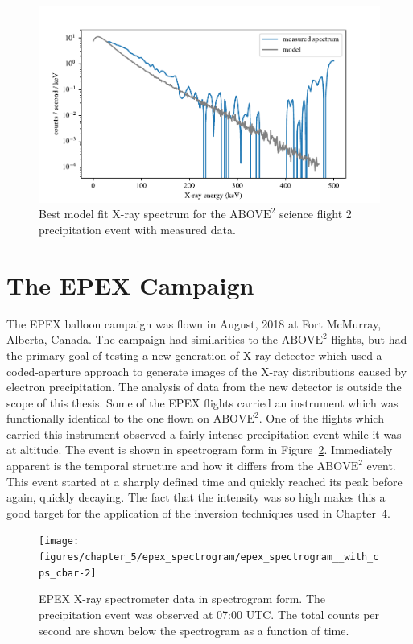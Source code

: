 \begin{figure}[p]
    \centering
    \includegraphics[width=1.0\textwidth]{figures/chapter_5/abv2_fit_problem/abv2_fit_problem}
    \caption{Best model fit X-ray spectrum for the $\text{ABOVE}^2$ science flight 2 precipitation event with measured data.}
    \label{abv2_fit_problem}
\end{figure}

\newpage
\section{The EPEX Campaign}

The EPEX balloon campaign was flown in August, 2018 at Fort McMurray, Alberta, Canada. The campaign had similarities to the $\text{ABOVE}^2$ flights, but had the primary goal of testing a new generation of X-ray detector which used a coded-aperture approach to generate images of the X-ray distributions caused by electron precipitation. The analysis of data from the new detector is outside the scope of this thesis. Some of the EPEX flights carried an instrument which was functionally identical to the one flown on $\text{ABOVE}^2$. One of the flights which carried this instrument observed a fairly intense precipitation event while it was at altitude. The event is shown in spectrogram form in Figure~\ref{epex_event_spectrogram}. Immediately apparent is the temporal structure and how it differs from the $\text{ABOVE}^2$ event. This event started at a sharply defined time and quickly reached its peak before again, quickly decaying. The fact that the intensity was so high makes this a good target for the application of the inversion techniques used in Chapter~4. 

\begin{figure}[p]
    \centering
    \texttt{[image: figures/chapter\_5/epex\_spectrogram/epex\_spectrogram\_\_with\_cps\_cbar-2]}
    \caption{EPEX X-ray spectrometer data in spectrogram form. The precipitation event was observed at 07:00 UTC. The total counts per second are shown below the spectrogram as a function of time.}
    \label{epex_event_spectrogram}
\end{figure}


